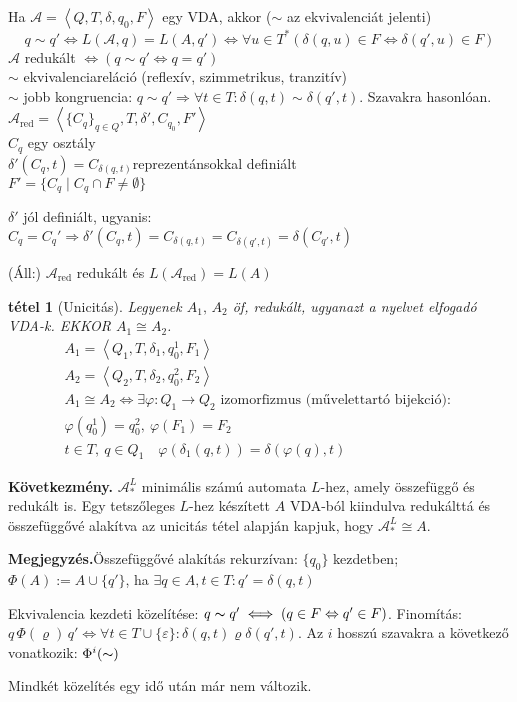 \documentclass[fleqn,10pt,a4paper]{article}
\newcommand{\nn}{\Rightarrow}
\newcommand{\vfi}{\varphi}
\renewcommand{\epsilon}{\varepsilon}
\theoremstyle{magyar}
\newtheorem{te}{tétel}[section]
\newenvironment{kov}{\begin{trivlist}\item\relax\mbox{\textbf{Következmény.\enskip}}\ignorespaces}{\end{trivlist}}
\newenvironment{megj}{\begin{trivlist}\item\relax\mbox{\textbf{Megjegyzés.\enskip}}\ignorespaces}{\end{trivlist}}
\newcommand{\A}{\mathcal{A}}
\begin{document}
  
  Ha $\A = \left<Q,T,\delta,q_0,F\right>$ egy VDA, akkor ($\sim$ az ekvivalenciát jelenti)
  \[q\sim q'\iff L(\A,q) = L(A,q') \iff \forall u\in T^* \left(\delta(q,u) \in F \Leftrightarrow \delta(q',u) \in F\right)\]
  $\A$ redukált $\iff (q\sim q' \Leftrightarrow q=q')$\\
  $\sim$ ekvivalenciareláció (reflexív, szimmetrikus, tranzitív)\\
  $\sim$ jobb kongruencia: $q\sim q' \nn \forall t\in T\colon \delta(q,t) \sim \delta(q',t)$. Szavakra hasonlóan.\\

  \noindent $\A_{\text{red}} = \left<\{C_q\}_{q\in Q}, T, \delta', C_{q_0}, F'\right>$\\
  $C_q$ egy osztály\\
  $\delta'(C_q,t) = C_{\delta(q,t)}$\quad reprezentánsokkal definiált\\
  $F'=\{C_q \mid C_q\cap F \neq \emptyset\}$
  
  $\delta'$ jól definiált, ugyanis:\\
  $C_q = C_q' \nn \delta'(C_q,t) = C_{\delta(q,t)}=C_{\delta(q',t)}=\delta(C_{q'},t)$

  (Áll:) $\A_{\text{red}}$ redukált és $L(\A_{\text{red}}) = L(A)$
  
  \begin{te}[Unicitás]Legyenek $A_1,\,A_2$ öf, redukált, ugyanazt a nyelvet elfogadó VDA-k. EKKOR $A_1\cong A_2$.
    \begin{gather*}
      A_1 = \left<Q_1,T,\delta_1,q_0^1,F_1\right>\\
      A_2 = \left<Q_2,T,\delta_2,q_0^2,F_2\right>\\
      A_1 \cong A_2 \iff \exists \vfi\colon Q_1\to Q_2 \text{ izomorfizmus (művelettartó bijekció): }\\
      \vfi(q_0^1) = q_0^2, \ \vfi(F_1) = F_2\\
      t\in T ,\ q\in Q_1 \quad \vfi(\delta_1(q,t)) = \delta(\vfi(q),t)	
    \end{gather*}
  \end{te}

  \begin{kov}
    $\A_*^L$ minimális számú automata $L$-hez, amely összefüggő és redukált is. Egy tetszőleges $L$-hez készített $A$
    VDA-ból kiindulva redukálttá és összefüggővé alakítva az unicitás tétel alapján kapjuk, hogy $\A_*^L\cong A$.
  \end{kov}
  \begin{megj}Összefüggővé alakítás rekurzívan: $\{ q_0\}$ kezdetben;\\$\Phi(A) := A\cup \{ q' \}$, ha $\exists q\in A, 
    t\in T\colon q' = \delta(q,t)$

    Ekvivalencia kezdeti közelítése: $q \thicksim q' \iff (q\in F \Leftrightarrow q'\in F)$. Finomítás:\\
    $q\, \Phi(\varrho)\, q' \iff \forall t \in T\cup \{\epsilon \}: \delta(q,t)\varrho \delta(q',t)$.  Az $i$ hosszú szavakra a
    következő vonatkozik: $\Phi^i(  \thicksim)$
    
    Mindkét közelítés egy idő után már nem változik.
  \end{megj}
  
\end{document}
